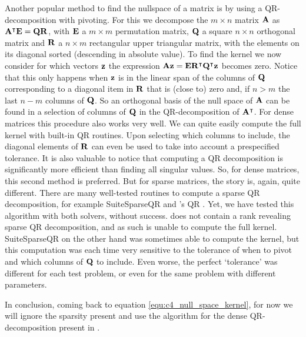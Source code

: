 Another popular \cite{trefethen_numerical_1997} method to find the nullspace of a matrix is by using a QR-decomposition with pivoting. For this we decompose the $m \times n$ matrix $\vb{A}$ as ${\vb{A}}^\intercal\vb{E} = \vb{Q} \vb{R}$, with $\vb{E}$ a $m\times m$ permutation matrix, $\vb{Q}$ a square $n \times n$ orthogonal matrix and $\vb{R}$ a $n \times m$ rectangular upper triangular matrix, with the elements on its diagonal sorted (descending in absolute value). To find the kernel we now consider for which vectors $\vb{z}$ the expression $\vb{A} \vb{z} = \vb{E}{\vb{R}}^\intercal{\vb{Q}}^\intercal\vb{z}$ becomes zero. Notice that this only happens when $\vb{z}$ is in the linear span of the columns of $\vb{Q}$ corresponding to a diagonal item in $\vb{R}$ that is (close to) zero and, if $n > m$ the last $n - m$ columns of $\vb{Q}$. So an orthogonal basis of the null space of $\vb{A}$ can be found in a selection of columns of $\vb{Q}$ in the QR-decomposition of ${\vb{A}}^\intercal$. For dense matrices this procedure also works very well. We can quite easily compute the full kernel with built-in QR routines. Upon selecting which columns to include, the diagonal elements of $\vb{R}$ can even be used to take into account a prespecified tolerance. It is also valuable to notice that computing a QR decomposition is significantly more efficient than finding all singular values. So, for dense matrices, this second method is preferred. But for sparse matrices, the story is, again, quite different. There are many well-tested routines to compute a sparse QR decomposition, for example SuiteSparseQR \cite{davis_algorithm_2011} and \Eigen{}'s QR \cite{guennebaud_eigen_2010}. Yet, we have tested this algorithm with both solvers, without success. \Eigen{} does not contain a rank revealing sparse QR decomposition, and as such is unable to compute the full kernel. SuiteSparseQR on the other hand was sometimes able to compute the kernel, but this computation was each time very sensitive to the tolerance of when to pivot and which columns of $\vb{Q}$ to include. Even worse, the perfect `tolerance' was different for each test problem, or even for the same problem with different parameters.

In conclusion, coming back to equation \eqref{equ:c4_null_space_kernel}, for now we will ignore the sparsity present and use the algorithm for the dense QR-decomposition present in \Eigen{} \cite{guennebaud_eigen_2010}.

